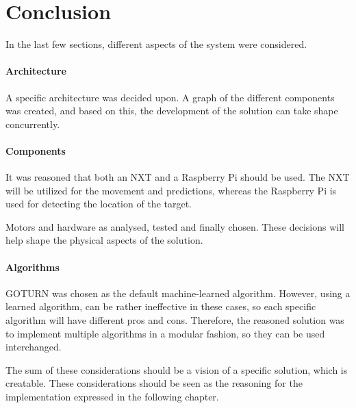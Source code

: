 \section{Conclusion}
In the last few sections, different aspects of the system were considered.

\paragraph{Architecture}
A specific architecture was decided upon.
A graph of the different components was created, and based on this, the development of the solution can take shape concurrently.


\paragraph{Components}
It was reasoned that both an NXT and a Raspberry Pi should be used.
The NXT will be utilized for the movement and predictions, whereas the Raspberry Pi is used for detecting the location of the target. 


Motors and hardware as analysed, tested and finally chosen. 
These decisions will help shape the physical aspects of the solution.


\paragraph{Algorithms}
GOTURN was chosen as the default machine-learned algorithm.
However, using a learned algorithm, can be rather ineffective in these cases, so each specific algorithm will have different pros and cons.
Therefore, the reasoned solution was to implement multiple algorithms in a modular fashion, so they can be used interchanged.


The sum of these considerations should be a vision of a specific solution, which is creatable. 
These considerations should be seen as the reasoning for the implementation expressed in the following chapter.
